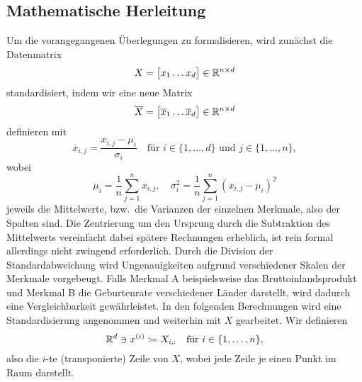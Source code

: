 \subsection{Mathematische Herleitung}

Um die vorangegangenen Überlegungen zu formalisieren, wird zunächst die Datenmatrix
\begin{equation*}
    X = 
    \big[
        \begin{matrix}
            x_1 \dots x_d
        \end{matrix}    
    \big] \in \mathbb{R}^{n \times d}
\end{equation*} 
standardisiert, indem wir eine neue Matrix 
\begin{equation*}
    \overline{X} = 
        \begin{bmatrix}
            \overline{x}_1 \dots \overline{x}_d
        \end{bmatrix} \in \mathbb{R}^{n \times d}
\end{equation*} 
definieren mit 
\begin{equation*}
    \overline{x}_{i,j} = \frac{x_{i,j}-\mu_i}{\sigma_i} \quad \text{für } i \in \{1,\ldots,d\} \text{ und } j \in \{1,\ldots,n\},
\end{equation*}  
wobei 
\begin{equation*}
    \mu_i = \frac{1}{n}\sum_{j=1}^{n}x_{i,j}, \quad \sigma_{i}^{2} = \frac{1}{n}\sum_{j=1}^{n}{(x_{i,j} - \mu_{i})}^{2}
\end{equation*}
jeweils die Mittelwerte, bzw.\ die Varianzen der einzelnen Merkmale, also der Spalten sind.
Die Zentrierung um den Ursprung durch die Subtraktion des Mittelwerts vereinfacht dabei spätere Rechnungen erheblich, ist rein formal allerdings nicht zwingend erforderlich.
Durch die Division der Standardabweichung wird Ungenauigkeiten aufgrund verschiedener Skalen der Merkmale vorgebeugt.
Falls Merkmal A beispielsweise das Bruttoinlandsprodukt und Merkmal B die Geburtenrate verschiedener Länder darstellt, wird dadurch eine Vergleichbarkeit gewährleistet.
In den folgenden Berechnungen wird eine Standardisierung angenommen und weiterhin mit \(X\) gearbeitet.
Wir definieren 
\begin{equation*}
    \mathbb{R}^{d} \ni x^{(i)} \coloneqq X_{i,:} \quad \text{für } i \in \{1,\ldots,n\},
\end{equation*}
also die \(i\)-te (transponierte) Zeile von \(X\), wobei jede Zeile je einen Punkt im Raum darstellt.

